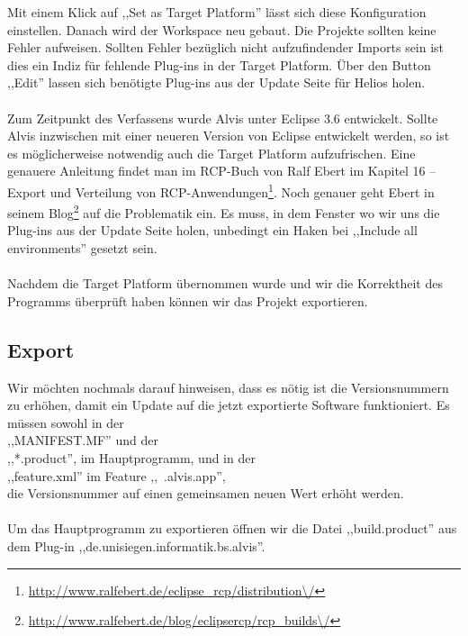 \documentclass[10pt,a4paper,oneside]{scrbook}
\begin{document}
Mit einem Klick auf ,,Set as Target Platform'' lässt sich diese Konfiguration einstellen. 
Danach wird der Workspace neu gebaut. Die Projekte sollten keine Fehler aufweisen. Sollten Fehler bezüglich nicht aufzufindender Imports sein ist dies ein Indiz für fehlende Plug-ins in der Target Platform. Über den Button ,,Edit'' lassen sich benötigte Plug-ins aus der Update Seite für Helios holen.
\\ \\
Zum Zeitpunkt des Verfassens wurde Alvis unter Eclipse 3.6 entwickelt. Sollte Alvis inzwischen mit einer neueren Version von Eclipse entwickelt werden, so ist es möglicherweise notwendig auch die Target Platform aufzufrischen. Eine genauere Anleitung findet man im RCP-Buch von Ralf Ebert im Kapitel 16 -- Export und Verteilung von RCP-Anwendungen\footnote{\url{http://www.ralfebert.de/eclipse\_rcp/distribution\/}}. Noch genauer geht Ebert in seinem Blog\footnote{\url{http://www.ralfebert.de/blog/eclipsercp/rcp\_builds\/}} auf die Problematik ein. Es muss, in dem Fenster wo wir uns die Plug-ins aus der Update Seite holen, unbedingt ein Haken bei ,,Include all environments'' gesetzt sein.
\\ \\

Nachdem die Target Platform übernommen wurde und wir die Korrektheit des Programms überprüft haben können wir das Projekt exportieren. 
\subsection{Export}
Wir möchten nochmals darauf hinweisen, dass es nötig ist die Versionsnummern zu erhöhen, damit ein Update auf die jetzt exportierte Software funktioniert. Es müssen sowohl in der \\
,,MANIFEST.MF'' und der \\
,,*.product'', im Hauptprogramm, und in der \\
,,feature.xml'' im Feature ,,~.alvis.app'', \\
die Versionsnummer auf einen gemeinsamen neuen Wert erhöht werden.
\\ \\
Um das Hauptprogramm zu exportieren öffnen wir die Datei ,,build.product'' aus dem Plug-in ,,de.unisiegen.informatik.bs.alvis''.

\begin{center}
\end{center}
\end{document}
